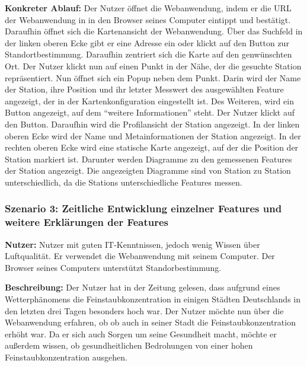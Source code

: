 \textbf{Konkreter Ablauf:} Der Nutzer öffnet die \gls{Webanwendung}, indem er die URL der \gls{Webanwendung} in in den Browser seines Computer eintippt 
und bestätigt. Daraufhin öffnet sich die Kartenansicht der \gls{Webanwendung}. Über das Suchfeld in der linken oberen Ecke gibt 
er eine Adresse ein oder klickt auf den Button zur Standortbestimmung. Daraufhin zentriert sich die Karte auf den genwünschten Ort. 
Der Nutzer klickt nun auf einen Punkt in der Nähe, der die gesuchte \gls{Station} repräsentiert. Nun öffnet sich ein Popup neben 
dem Punkt. Darin wird der Name der \gls{Station}, ihre Position und ihr letzter \gls{Messwert} des ausgewählten \gls{Feature} 
angezeigt, der in der Kartenkonfiguration eingestellt ist. Des Weiteren, wird ein Button angezeigt, auf dem \enquote{weitere Informationen} 
steht. Der Nutzer klickt auf den Button.
Daraufhin wird die Profilansicht der \gls{Station} angezeigt. In der linken oberen Ecke wird der Name und Metainformationen 
der \gls{Station} angezeigt. In der rechten oberen Ecke wird eine statische Karte angezeigt, auf der die Position der \gls{Station} 
markiert ist.
Darunter werden Diagramme zu den gemessenen Features der \gls{Station} angezeigt. Die angezeigten Diagramme sind von \gls{Station} 
zu \gls{Station} unterschiedlich, da die \glspl{Station} unterschiedliche Features messen.

\newpage
\subsubsection*{Szenario 3: Zeitliche Entwicklung einzelner \glspl{Feature} und weitere Erklärungen der \glspl{Feature}}
\textbf{Nutzer:} Nutzer mit guten IT-Kenntnissen, jedoch wenig Wissen über Luftqualität. Er verwendet die \gls{Webanwendung}
mit seinem Computer. Der Browser seines Computers unterstützt Standorbestimmung.

\textbf{Beschreibung:} Der Nutzer hat in der Zeitung gelesen, dass aufgrund eines Wetterphänomens die Feinstaubkonzentration in
einigen Städten Deutschlands in den letzten drei Tagen besonders hoch war. Der Nutzer möchte nun über die \gls{Webanwendung} erfahren, ob
ob auch in seiner Stadt die Feinstaubkonzentration erhöht war. Da er sich auch Sorgen um seine Gesundheit macht, möchte er außerdem 
wissen, ob gesundheitlichen Bedrohungen von einer hohen Feinstaubkonzentration ausgehen.

